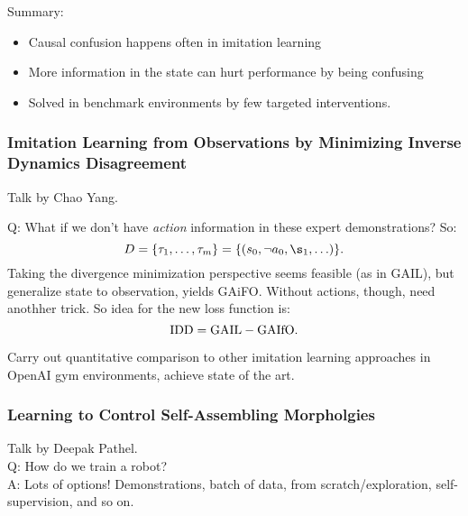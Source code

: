Summary:
\begin{itemize}
    \item Causal confusion happens often in imitation learning
    \item More information in the state can hurt performance by being confusing
    \item Solved in benchmark environments by few targeted interventions.
\end{itemize}


\subsubsection{Imitation Learning from Observations by Minimizing Inverse Dynamics Disagreement}

Talk by Chao Yang. \\


Q: What if we don't have {\it action} information in these expert demonstrations? So:
\[
D = \{\tau_1, \ldots, \tau_m\} = \{(s_0, \neg a_0, \s_1, \ldots)\}.
\]
Taking the divergence minimization perspective seems feasible (as in GAIL), but generalize state to observation, yields GAiFO. Without actions, though, need anothher trick. So idea for the new loss function is:
\[
\text{IDD} = \text{GAIL} -\text{GAIfO}.
\]


Carry out quantitative comparison to other imitation learning approaches in OpenAI gym environments, achieve state of the art. \\

\subsubsection{Learning to Control Self-Assembling Morpholgies \cite{pathak2019learning}}

Talk by Deepak Pathel. \\

Q: How do we train a robot? \\

A: Lots of options! Demonstrations, batch of data, from scratch/exploration, self-supervision, and so on. \\

